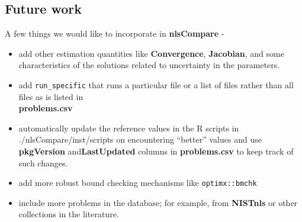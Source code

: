 \hypertarget{future-work}{%
\subsection{Future work}\label{future-work}}

A few things we would like to incorporate in \textbf{nlsCompare} -

\begin{itemize}
\tightlist
\item
  add other estimation quantities like \textbf{Convergence},
  \textbf{Jacobian}, and some characteristics of the solutions related
  to uncertainty in the parameters.
\item
  add \texttt{run\_specific} that runs a particular file or a list of
  files rather than all files as is listed in\\
  \textbf{problems.csv}
\item
  automatically update the reference values in the R scripts in
  ./nlsCompare/inst/scripts on encountering ``better'' values and use
  \textbf{pkgVersion} and\textbf{LastUpdated} columns in
  \textbf{problems.csv} to keep track of such changes.
\item
  add more robust bound checking mechanisms like \texttt{optimx::bmchk}
\item
  include more problems in the database; for example, from
  \textbf{NISTnls} or other collections in the literature.
\end{itemize}



\address{%
Arkajyoti Bhattacharjee\(^1\)\\
Mathematics and Statistics Department\\%
Indian Institute of Technology, Kanpur\\ India\\
%
%
%
\href{mailto:arkastat98@gmail.com}{\nolinkurl{arkastat98@gmail.com}}%
}

\address{%
John C. Nash\(^2\)\\
University of Ottawa\\%
\\
%
\url{https://journal.r-project.org}\\%
\textit{ORCiD: \href{https://orcid.org/0000-0002-9079-593X}{0000-0002-9079-593X}}\\%
\href{mailto:nashjc@uottawa.ca}{\nolinkurl{nashjc@uottawa.ca}}%
}

\address{%
Heather Turner\(^3\)\\
Department of Statistics\\%
University of Warwick\\ Coventry\\ United Kingdom\\
%
%
\textit{ORCiD: \href{https://orcid.org/0000-0002-1256-3375}{0000-0002-1256-3375}}\\%
\href{mailto:ht@heatherturner.net}{\nolinkurl{ht@heatherturner.net}}%
}

